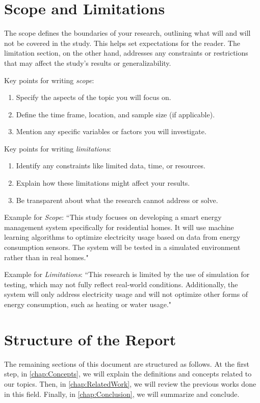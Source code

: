 \section{Scope and Limitations}
The scope defines the boundaries of your research, outlining what will and will not be covered in the study. This helps set expectations for the reader. The limitation section, on the other hand, addresses any constraints or restrictions that may affect the study’s results or generalizability.

Key points for writing \textit{scope}:
\begin{enumerate}
\item Specify the aspects of the topic you will focus on.
\item Define the time frame, location, and sample size (if applicable).
\item Mention any specific variables or factors you will investigate.
\end{enumerate}

Key points for writing \textit{limitations}:
\begin{enumerate}
\item Identify any constraints like limited data, time, or resources.
\item Explain how these limitations might affect your results.
\item Be transparent about what the research cannot address or solve.
\end{enumerate}
Example for \textit{Scope}: ``This study focuses on developing a smart energy management system specifically for residential homes. It will use machine learning algorithms to optimize electricity usage based on data from energy consumption sensors. The system will be tested in a simulated environment rather than in real homes."

Example for \textit{Limitations}: ``This research is limited by the use of simulation for testing, which may not fully reflect real-world conditions. Additionally, the system will only address electricity usage and will not optimize other forms of energy consumption, such as heating or water usage."



\section{Structure of the Report}
The remaining sections of this document are structured as follows.  At the first step, in  \autoref{chap:Concepts}, we will explain the definitions and concepts related to our topics. Then, in \autoref{chap:RelatedWork}, we will review the previous works done in this field. Finally, in \autoref{chap:Conclusion}, we will summarize and conclude.







